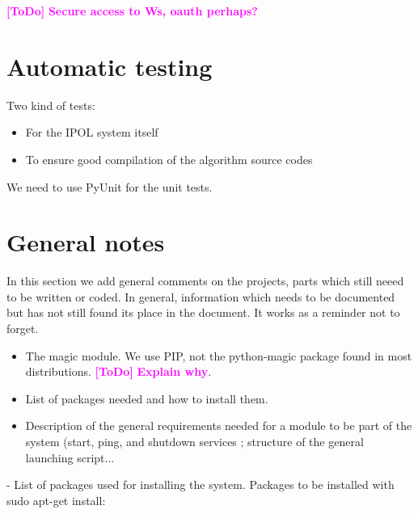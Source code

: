 \documentclass[a4paper,12pt]{article}
\newcommand{\ToDo}[1]{\textcolor{magenta}{\textbf{[ToDo]} \textbf{#1}}}
\begin{document}









\ToDo{Secure access to Ws, oauth perhaps?}







\section{Automatic testing}
Two kind of tests:
\begin{itemize}
  \item For the IPOL system itself
  \item To ensure good compilation of the algorithm source codes
\end{itemize}

We need to use PyUnit for the unit tests.

\section{General notes}
In this section we add general comments on the projects, parts which still neeed to be written or coded. In general, information which needs to be documented but has not still found its place in the document. It works as a reminder not to forget.

\begin{itemize}
  \item The magic module. We use PIP, not the python-magic package found in most distributions. \ToDo{Explain why}.
  \item List of packages needed and how to install them.
  \item Description of the general requirements needed for a module to be part of the system (start, ping, and shutdown services ; structure of the general launching script...
\end{itemize}

- List of packages used for installing the system. Packages to be installed with sudo apt-get install:
\end{document}
